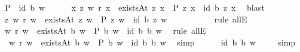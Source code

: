 \begin{isabellebody}
\ {\isachardoublequoteopen}{\isacharparenleft}{\isacharparenleft}P\ {\isasymRrightarrow}\ {\isacharparenleft}\isactrlbold {\isasymrightharpoondown}{\isacharparenleft}id\ b{\isacharparenright}{\isacharparenright}{\isacharparenright}\ w{\isacharparenright}{\isachardoublequoteclose}\isanewline
\ \ \ \ \isamarkupfalse%
\ {\isachardoublequoteopen}{\isasymforall}x{\isachardot}\ {\isasymforall}z{\isachardot}\ {\isacharparenleft}w\ r\ x\ {\isasymand}\ existsAt\ z\ x\ {\isasymand}\ P\ z\ x{\isacharparenright}\ {\isasymlongrightarrow}\ {\isacharparenleft}\isactrlbold {\isasymrightharpoondown}{\isacharparenleft}id\ b{\isacharparenright}{\isacharparenright}\ z\ x{\isachardoublequoteclose}\ \isamarkupfalse%
\ blast\isanewline
\ \ \ \ \isamarkupfalse%
\ {\isachardoublequoteopen}{\isasymforall}z{\isachardot}\ {\isacharparenleft}w\ r\ w{}\ {\isasymand}\ existsAt\ z\ w{}\ {\isasymand}\ P\ z\ w{}{\isacharparenright}\ {\isasymlongrightarrow}\ {\isacharparenleft}\isactrlbold {\isasymrightharpoondown}{\isacharparenleft}id\ b{\isacharparenright}{\isacharparenright}\ z\ w{}{\isachardoublequoteclose}\ \isanewline
\ \ \ \ \ \ \ \ \isamarkupfalse%
\ {\isacharparenleft}rule\ allE{\isacharparenright}\isanewline
\ \ \ \ \isamarkupfalse%
\ {\isachardoublequoteopen}{\isacharparenleft}w\ r\ w{}\ {\isasymand}\ existsAt\ b\ w{}\ {\isasymand}\ P\ b\ w{}{\isacharparenright}\ {\isasymlongrightarrow}\ {\isacharparenleft}\isactrlbold {\isasymrightharpoondown}{\isacharparenleft}id\ b{\isacharparenright}{\isacharparenright}\ b\ w{}{\isachardoublequoteclose}\ \isamarkupfalse%
\ {\isacharparenleft}rule\ allE{\isacharparenright}\isanewline
\ \ \ \ \isamarkupfalse%
\ \ {\isachardoublequoteopen}{\isasymnot}{\isacharparenleft}w\ r\ w{}\ {\isasymand}\ existsAt\ b\ w{}\ {\isasymand}\ P\ b\ w{}{\isacharparenright}\ {\isasymor}\ {\isacharparenleft}\isactrlbold {\isasymrightharpoondown}{\isacharparenleft}id\ b{\isacharparenright}{\isacharparenright}\ b\ w{}{\isachardoublequoteclose}\ \isamarkupfalse%
\ simp\isanewline
\ \ \ \ \isamarkupfalse%
\ {\isachardoublequoteopen}{\isacharparenleft}\isactrlbold {\isasymrightharpoondown}{\isacharparenleft}id\ b{\isacharparenright}{\isacharparenright}\ b\ w{\isachardoublequoteclose}\ \isamarkupfalse%
\ {}\ \isamarkupfalse%
\ simp\isanewline

\end{isabellebody}
